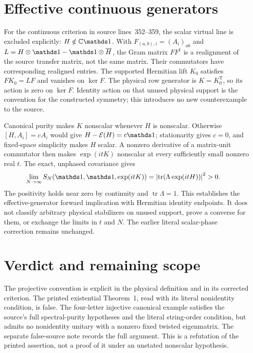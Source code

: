 \documentclass[11pt]{article}
\begin{document}
\section{Effective continuous generators}

For the continuous criterion in source lines~352--359, the scalar virtual
line is excluded explicitly: $H\notin\C\Id$.  With
$F_{(a,b),i}=(A_i)_{ab}$ and $L=H\otimes\Id-\Id\otimes\overline H$,
the Gram matrix $FF^\dagger$ is a realignment of the source transfer matrix,
not the same matrix.  Their commutators have corresponding realigned entries.
The supported Hermitian lift $K_0$ satisfies $FK_0=LF$ and vanishes on
$\ker F$.  The physical row generator is $K=K_0^{\mathsf T}$, so its action
is zero on $\overline{\ker F}$.  Identity action on that unused physical
support is the convention for the constructed symmetry; this introduces no
new counterexample to the source.

Canonical purity makes $K$ nonscalar whenever $H$ is nonscalar.  Otherwise
$[H,A_i]=cA_i$ would give $H-\mathcal E(H)=c\Id$; stationarity gives $c=0$,
and fixed-space simplicity makes $H$ scalar.  A nonzero derivative of a
matrix-unit commutator then makes $\exp(itK)$ nonscalar at every sufficiently
small nonzero real $t$.  The exact, unphased covariance gives
\begin{align}
 \lim_{N\to\infty}S_N(\Id,\Id,\exp(itK))
 &=\left|\operatorname{tr}(\Lambda\exp(itH))\right|^2>0.
 \notag
\end{align}
The positivity holds near zero by continuity and $\operatorname{tr}\Lambda=1$.
This establishes the effective-generator forward implication with Hermitian
identity endpoints.  It does not classify arbitrary physical stabilizers on
unused support, prove a converse for them, or exchange the limits in $t$ and
$N$.  The earlier literal scalar-phase correction remains unchanged.

\section{Verdict and remaining scope}

The projective convention is explicit in the physical definition and in its
corrected criterion. The printed existential Theorem~1, read with its literal
nonidentity condition, is false. The four-letter injective canonical example
satisfies the source's full spectral-purity hypotheses and the literal
string-order condition, but admits no nonidentity unitary with a nonzero
fixed twisted eigenmatrix. The separate false-source note
 records the full argument.
This is a refutation of the printed assertion, not a proof of it under an
unstated nonscalar hypothesis.
\end{document}
